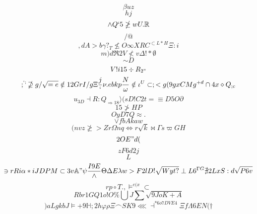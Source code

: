 \documentclass[12pt]{article}
\begin{document}
        \begin{minipage}[t][0pt]{\linewidth}

        \[\beta u z\]
\[hj\]
\[\land Q ` 5\ngeq w U .\mathbb{R}\]
\[/@\]
\[, {dA>b}\gamma ?_{T}\nleq O\infty X R C^{\subset L * H}\Xi : i\]
\[m)d\Re 2 V\nless v\Delta ! *\emptyset\]
\[\sim D\]
\[V!i15\div R_{2"}\]
\[;^{`:}\nsupseteq g /\sqrt{=e}\notin 1 2 G r I / g\Xi\frac{j}{`}\nu . e b k p\frac{N}{\omega}\notin\iota^{U}\subset ; < g ( 9 g x C M g^{+d}\cap 4 x\diamond Q_{;c}\]
\[u_{3D}\dashv R : Q_{\Longrightarrow 1 8}\rangle ( s D ! C 2 t =\equiv D {5O}\partial\]
\[15\ngtr H P\]
\[OyD7Q\approx .\]
\[\lor f b A k {aw}\]
\[(nvz\ngeq > Z r\Omega n q\Leftrightarrow r\sqrt{k}\bowtie\Gamma s\varpi G H\]
\[2OE"d(\]
\[zF6d2j\]
\[L\]
\[\ni r R i\alpha * i J D P M\subset 3 v\mathbb{A} "\psi\frac{I9E}{\land}\Theta\Delta E\lambda w > F 2 l D !\sqrt{Wyt?}\perp L 6^{\Gamma G}\nexists 2 L x S : d\sqrt{P6v}\]
\[rp\circ T . ,\models^{e(x}\subset\]
\[Rbr1GQ1o!O\%\bigcup J\sum\sqrt{9JoK+A}\]
\[)aLgkbJ\models + 9\mathbb{H} ; 2 h\varphi\rho\Xi\frown S K 9\lll\dashv^{*6o7DVE4}\Xi f\Lambda 6 E N (\dagger
        \]
\end{minipage}
\end{document}

